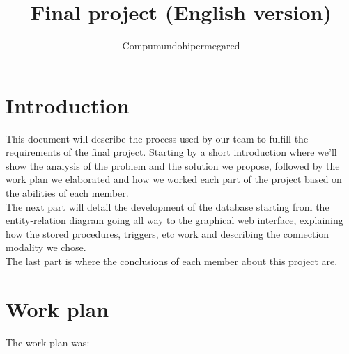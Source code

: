\documentclass{article}
\begin{document}
\title{Final project (English version)}
\author{Compumundohipermegared}
\maketitle

\section{Introduction}
This document will describe the process used by our team to fulfill the requirements of the final project. Starting by a short introduction where we’ll show the analysis of the problem and the solution we propose, followed by the work plan we elaborated and how we worked each part of the project based on the abilities of each member.\\

The next part will detail the development of the database starting from the entity-relation diagram going all way to the graphical web interface, explaining how the stored procedures, triggers, etc work and describing the connection modality we chose.\\

The last part is where the conclusions of each member about this project are.\\

\section{Work plan}
The work plan was:\\
\end{document}
